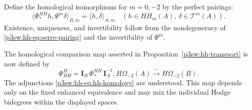 \documentclass[11pt]{article}
\numberwithin{equation}{section}
\begin{document}
Define the homological isomorphisms for \(m=0,-2\) by the perfect
pairings:
\begin{equation}
 \bigl\langle\Phi_*^{HH}h,\Psi^m\delta\bigr\rangle_{B,m}
       =\langle h,\delta\rangle_{A,m}
       \quad(h\in HH_m(A),\ \delta\in\mathscr T^m(A)).
\label{p3sw:hh-eq:homology-transport}
\end{equation}
Existence, uniqueness, and invertibility follow from the
nondegeneracy of \eqref{p3sw:hh-eq:serre-pairing} and the
invertibility of \(\Psi^m\).

The homological comparison map asserted in
Proposition~\ref{p3sw:hh-transport} is now defined by
\begin{equation}
 \Phi^H_{HH}
    =\mathbf I_B\,\Phi_*^{HH}\,\mathbf I_A^{-1}:
       H\Omega_{-2}(A)\xrightarrow{\sim}H\Omega_{-2}(B).
\label{p3sw:hh-eq:hodge-transport}
\end{equation}
The adjunctions \eqref{p3sw:hh-eq:hh-homology} are understood.
This map depends only on the fixed enhanced equivalence and may
mix the individual Hodge bidegrees within the displayed spaces.
\end{document}
